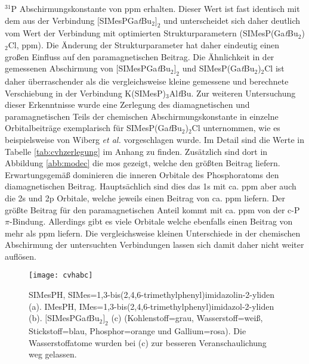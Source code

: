 $^{31}$P Abschirmungskonstante von \unit[336]{ppm} erhalten. Dieser Wert ist fast identisch mit dem aus der Verbindung $[$SIMesPGa\textit{t}Bu$_2]_2$ und unterscheidet sich daher deutlich vom Wert der Verbindung mit optimierten Strukturparametern (SIMesP(Ga\textit{t}Bu$_2$)$_2$Cl, \unit[380]{ppm}). Die Änderung der Strukturparameter hat daher eindeutig einen großen Einfluss auf den paramagnetischen Beitrag. Die Ähnlichkeit in der gemessenen Abschirmung von $[$SIMesPGa\textit{t}Bu$_2]_2$ und SIMesP(Ga\textit{t}Bu$_2$)$_2$Cl ist daher überraschender als die vergleichsweise kleine gemessene und berechnete Verschiebung in der Verbindung K(SIMesP)$_3$Al\textit{t}Bu.
Zur weiteren Untersuchung dieser Erkenntnisse wurde eine Zerlegung des diamagnetischen und paramagnetischen Teils der chemischen Abschirmungskonstante in einzelne Orbitalbeiträge exemplarisch für SIMesP(Ga\textit{t}Bu$_2$)$_2$Cl unternommen, wie es beispielsweise von Wiberg \textit{et al.}\supercite{wiberg1998nmr} vorgeschlagen wurde. Im Detail sind die Werte in Tabelle \ref{tab:cvhzerlegung} im Anhang zu finden. Zusätzlich sind dort in Abbildung \ref{abb:modec} die \acp{mo} gezeigt, welche den größten Beitrag liefern. Erwartungsgemäß dominieren die inneren Orbitale des Phosphoratoms den diamagnetischen Beitrag. Hauptsächlich sind dies das 1s mit ca. \unit[500]{ppm} aber auch die 2s und 2p Orbitale, welche jeweils einen Beitrag von ca. \unit[100]{ppm} liefern. Der größte Beitrag für den paramagnetischen Anteil kommt mit ca. \unit[-180]{ppm} von der c-P $\pi$-Bindung. Allerdings gibt es viele Orbitale welche ebenfalls einen Beitrag von mehr als \unit[10]{ppm} liefern. Die vergleichsweise kleinen Unterschiede in der chemischen Abschirmung der untersuchten Verbindungen lassen sich damit daher nicht weiter auflösen.

\begin{figure}[ht!]
	\centering
	\texttt{[image: cvhabc]}
	\captionsetup{figurewithin = chapter}
	\captionsetup{font=small, labelfont=bf}\caption[{Abbildung von SIMesPH, IMesPH und $[$SIMesPGa\textit{t}Bu$_2]_2$}]{ SIMesPH, SIMes=1,3-bis(2,4,6-tri\-me\-thyl\-phe\-nyl)imi\-da\-zo\-lin-2-yli\-den (a). IMesPH, IMes=1,3-bis(2,4,6-tri\-me\-thyl\-phe\-nyl)imi\-da\-zol-2-yli\-den (b). $[$SIMesPGa\textit{t}Bu$_2]_2$ (c) (Kohlenstoff=grau, Wasserstoff=weiß, Stickstoff=blau, Phosphor=orange und Gallium=rosa). Die Wasserstoffatome wurden bei (c) zur besseren Veranschaulichung weg gelassen.}
\label{abb:cvhabc}
\end{figure}

